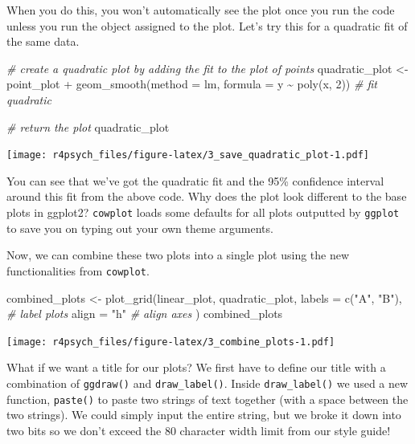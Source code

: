 \documentclass[
]{book}
\newenvironment{Shaded}{\begin{snugshade}}{\end{snugshade}}
\newcommand{\AttributeTok}[1]{\textcolor[rgb]{0.77,0.63,0.00}{#1}}
\newcommand{\CommentTok}[1]{\textcolor[rgb]{0.56,0.35,0.01}{\textit{#1}}}
\newcommand{\DecValTok}[1]{\textcolor[rgb]{0.00,0.00,0.81}{#1}}
\newcommand{\FunctionTok}[1]{\textcolor[rgb]{0.00,0.00,0.00}{#1}}
\newcommand{\NormalTok}[1]{#1}
\newcommand{\OtherTok}[1]{\textcolor[rgb]{0.56,0.35,0.01}{#1}}
\newcommand{\SpecialCharTok}[1]{\textcolor[rgb]{0.00,0.00,0.00}{#1}}
\newcommand{\StringTok}[1]{\textcolor[rgb]{0.31,0.60,0.02}{#1}}
\begin{document}
When you do this, you won't automatically see the plot once you run the code unless you run the object assigned to the plot. Let's try this for a quadratic fit of the same data.

\begin{Shaded}
\begin{Highlighting}[]
\CommentTok{\# create a quadratic plot by adding the fit to the plot of points}
\NormalTok{quadratic\_plot }\OtherTok{\textless{}{-}}\NormalTok{ point\_plot }\SpecialCharTok{+} 
  \FunctionTok{geom\_smooth}\NormalTok{(}\AttributeTok{method =} \StringTok{\textquotesingle{}lm\textquotesingle{}}\NormalTok{, }\AttributeTok{formula =}\NormalTok{ y }\SpecialCharTok{\textasciitilde{}} \FunctionTok{poly}\NormalTok{(x, }\DecValTok{2}\NormalTok{)) }\CommentTok{\# fit quadratic}
  
\CommentTok{\# return the plot}
\NormalTok{quadratic\_plot}
\end{Highlighting}
\end{Shaded}

\texttt{[image: r4psych\_files/figure-latex/3\_save\_quadratic\_plot-1.pdf]}

You can see that we've got the quadratic fit and the 95\% confidence interval around this fit from the above code. Why does the plot look different to the base plots in ggplot2? \texttt{cowplot} loads some defaults for all plots outputted by \texttt{ggplot} to save you on typing out your own theme arguments.

Now, we can combine these two plots into a single plot using the new functionalities from \texttt{cowplot}.

\begin{Shaded}
\begin{Highlighting}[]
\NormalTok{combined\_plots }\OtherTok{\textless{}{-}} \FunctionTok{plot\_grid}\NormalTok{(linear\_plot, }
\NormalTok{                            quadratic\_plot, }
                            \AttributeTok{labels =} \FunctionTok{c}\NormalTok{(}\StringTok{"A"}\NormalTok{, }\StringTok{"B"}\NormalTok{), }\CommentTok{\# label plots}
                            \AttributeTok{align =} \StringTok{"h"} \CommentTok{\# align axes}
\NormalTok{                            ) }
\NormalTok{combined\_plots}
\end{Highlighting}
\end{Shaded}

\texttt{[image: r4psych\_files/figure-latex/3\_combine\_plots-1.pdf]}

What if we want a title for our plots? We first have to define our title with a combination of \texttt{ggdraw()} and \texttt{draw\_label()}. Inside \texttt{draw\_label()} we used a new function, \texttt{paste()} to paste two strings of text together (with a space between the two strings). We could simply input the entire string, but we broke it down into two bits so we don't exceed the 80 character width limit from our style guide!
\end{document}
